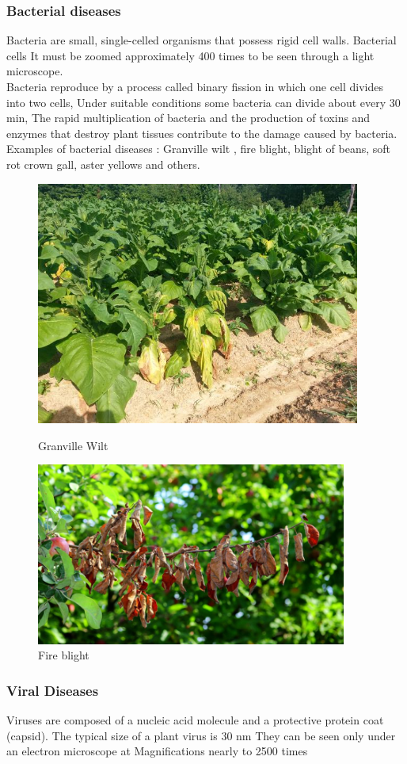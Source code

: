 \subsubsection{Bacterial diseases}
Bacteria are small, single-celled organisms that possess rigid cell walls. Bacterial cells It must be zoomed approximately 400 times to be seen through a light microscope. \\
Bacteria reproduce by a process called binary fission in which one cell divides into two cells, Under suitable conditions  some bacteria can divide about every 30 min, The rapid multiplication of bacteria and the production of toxins and enzymes that destroy plant tissues contribute to the damage caused by bacteria.\cite{book1} \\
Examples of bacterial diseases :  Granville wilt , fire blight, blight of beans, soft rot crown gall, aster yellows and others.
\begin{figure}[!h]
    \centering
    \includegraphics[height=8cm]{chapters/chapter01/fig01/Granville_Wilt.jpg}
    \caption{Granville Wilt}
    \includegraphics[height=6cm]{chapters/chapter01/fig01/fire-blight.jpg}
    \caption{Fire blight}
\end{figure}
\subsubsection{Viral Diseases}
Viruses are composed of a nucleic acid molecule and a protective protein coat (capsid). The typical size of a plant virus is 30 nm They can be seen only under an electron microscope at Magnifications nearly to 2500 times \cite{art1} \\

